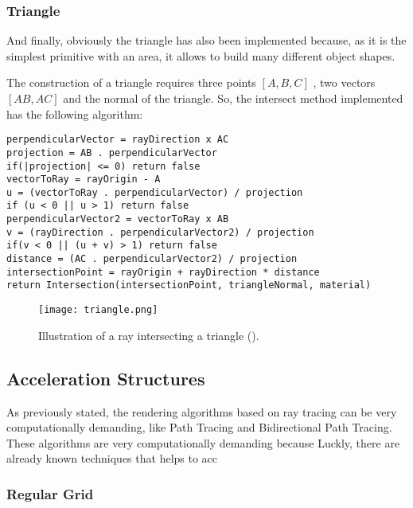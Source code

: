 \subsubsection{Triangle}

\par
And finally, obviously the triangle has also been implemented because, as it is the simplest primitive with an area, it allows to build many different object shapes.

\par
The construction of a triangle requires three points
$[A, B, C]$
, two vectors
$[AB, AC]$
and the normal of the triangle.
So, the intersect method implemented has the following algorithm:

\begin{lstlisting}
perpendicularVector = rayDirection x AC
projection = AB . perpendicularVector
if(|projection| <= 0) return false
vectorToRay = rayOrigin - A
u = (vectorToRay . perpendicularVector) / projection
if (u < 0 || u > 1) return false
perpendicularVector2 = vectorToRay x AB
v = (rayDirection . perpendicularVector2) / projection
if(v < 0 || (u + v) > 1) return false
distance = (AC . perpendicularVector2) / projection
intersectionPoint = rayOrigin + rayDirection * distance
return Intersection(intersectionPoint, triangleNormal, material)
\end{lstlisting}

\begin{figure}[H]
	\centering
	\caption{Illustration of a ray intersecting a triangle (\cite{TriangleRayIntersection}).}
	\label{Sphere.}
	\texttt{[image: triangle.png]}
\end{figure}

\subsection{Acceleration Structures}

\par
As previously stated, the rendering algorithms based on ray tracing can be very computationally demanding, like Path Tracing and Bidirectional Path Tracing.
These algorithms are very computationally demanding because 
Luckly, there are already known techniques that helps to acc

\subsubsection{Regular Grid}

